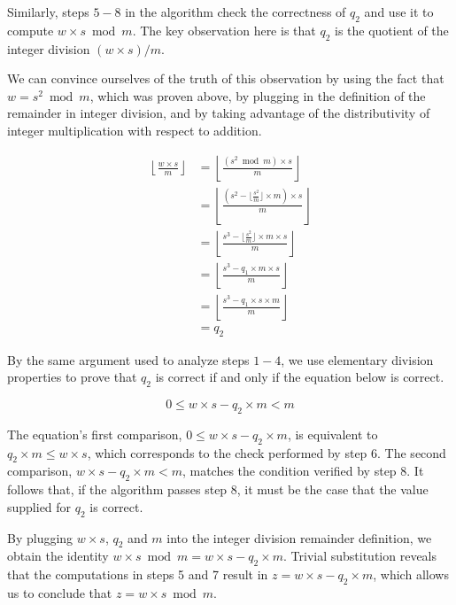 
Similarly, steps $5 - 8$ in the algorithm check the correctness of $q_2$ and
use it to compute $w \times s \bmod m$. The key observation here is that
$q_2$ is the quotient of the integer division $(w \times s) / m$.

We can convince ourselves of the truth of this observation by using the fact
that $w = s^2 \bmod m$, which was proven above, by plugging in the definition
of the remainder in integer division, and by taking advantage of the
distributivity of integer multiplication with respect to addition.

\begin{align*}
\left\lfloor \frac{w \times s}{m} \right\rfloor
    & = \left\lfloor \frac{(s^2 \bmod m) \times s}{m} \right\rfloor \\
    & = \left\lfloor \frac{(s^2 - \lfloor \frac{s^2}{m} \rfloor \times m)
        \times s}{m} \right\rfloor \\
    & = \left\lfloor \frac{s^3 - \lfloor \frac{s^2}{m} \rfloor \times m
        \times s}{m} \right\rfloor \\
    & = \left\lfloor \frac{s^3 - q_1 \times m \times s}{m} \right\rfloor \\
    & = \left\lfloor \frac{s^3 - q_1 \times s \times m}{m} \right\rfloor \\
    & = q_2
\end{align*}

By the same argument used to analyze steps $1 - 4$, we use elementary division
properties to prove that $q_2$ is correct if and only if the equation below is
correct.

$$ 0 \le w \times s - q_2 \times m < m $$

The equation's first comparison, $0 \le w \times s - q_2 \times m$, is
equivalent to $q_2 \times m \le w \times s$, which corresponds to the check
performed by step 6. The second comparison, $w \times s - q_2 \times m < m$,
matches the condition verified by step 8. It follows that, if the algorithm
passes step 8, it must be the case that the value supplied for $q_2$ is
correct.

By plugging $w \times s$, $q_2$ and $m$ into the integer division remainder
definition, we obtain the identity
$w \times s \bmod m = w \times s - q_2 \times m$. Trivial substitution reveals
that the computations in steps 5 and 7 result in
$z = w \times s - q_2 \times m$, which allows us to conclude that
$z = w \times s \bmod m$.


